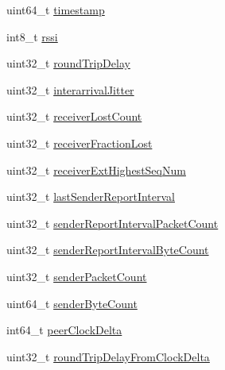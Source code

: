 \begin{DoxyCompactItemize}
\item 
uint64\+\_\+t \hyperlink{struct_a_r_s_t_r_e_a_m2___stream_stats___rtp_stats__t_ad704259617663b532001453d8ea15d0d}{timestamp}
\item 
int8\+\_\+t \hyperlink{struct_a_r_s_t_r_e_a_m2___stream_stats___rtp_stats__t_af42a72b6987f2cdae39c926d1ec05a10}{rssi}
\item 
uint32\+\_\+t \hyperlink{struct_a_r_s_t_r_e_a_m2___stream_stats___rtp_stats__t_a1d876fd2e68c315e16c6c15a93c8ad8d}{round\+Trip\+Delay}
\item 
uint32\+\_\+t \hyperlink{struct_a_r_s_t_r_e_a_m2___stream_stats___rtp_stats__t_aa78a54cfb5830bf926d17a85e8f08569}{interarrival\+Jitter}
\item 
uint32\+\_\+t \hyperlink{struct_a_r_s_t_r_e_a_m2___stream_stats___rtp_stats__t_a50d8a2988d14f1de7123085a54378861}{receiver\+Lost\+Count}
\item 
uint32\+\_\+t \hyperlink{struct_a_r_s_t_r_e_a_m2___stream_stats___rtp_stats__t_aebfa0e1d42ecc8970b8eb3944b2f75a3}{receiver\+Fraction\+Lost}
\item 
uint32\+\_\+t \hyperlink{struct_a_r_s_t_r_e_a_m2___stream_stats___rtp_stats__t_ab6b2079555daad3a169a4b628b897b3f}{receiver\+Ext\+Highest\+Seq\+Num}
\item 
uint32\+\_\+t \hyperlink{struct_a_r_s_t_r_e_a_m2___stream_stats___rtp_stats__t_ab51624a7a68752c7073429860a2f6c21}{last\+Sender\+Report\+Interval}
\item 
uint32\+\_\+t \hyperlink{struct_a_r_s_t_r_e_a_m2___stream_stats___rtp_stats__t_a2e91777ab7d26ce357bc5dc3a81ef883}{sender\+Report\+Interval\+Packet\+Count}
\item 
uint32\+\_\+t \hyperlink{struct_a_r_s_t_r_e_a_m2___stream_stats___rtp_stats__t_a5662186a803ccdc648929b5e4380a5ca}{sender\+Report\+Interval\+Byte\+Count}
\item 
uint32\+\_\+t \hyperlink{struct_a_r_s_t_r_e_a_m2___stream_stats___rtp_stats__t_a249b2126f7de64030a4b16427ab6f279}{sender\+Packet\+Count}
\item 
uint64\+\_\+t \hyperlink{struct_a_r_s_t_r_e_a_m2___stream_stats___rtp_stats__t_af2ca76def63684a040070956fa5b582b}{sender\+Byte\+Count}
\item 
int64\+\_\+t \hyperlink{struct_a_r_s_t_r_e_a_m2___stream_stats___rtp_stats__t_a6d9734c003ede485a86556f343b7e9a1}{peer\+Clock\+Delta}
\item 
uint32\+\_\+t \hyperlink{struct_a_r_s_t_r_e_a_m2___stream_stats___rtp_stats__t_a13c44344100d909be29b37feada2d204}{round\+Trip\+Delay\+From\+Clock\+Delta}
\end{DoxyCompactItemize}


